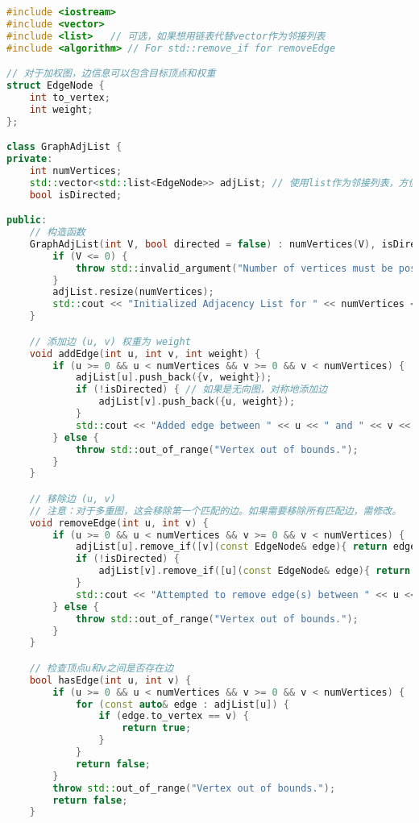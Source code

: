 \begin{lstlisting}[language=cpp]
#include <iostream>
#include <vector>
#include <list>   // 可选，如果想用链表代替vector作为邻接列表
#include <algorithm> // For std::remove_if for removeEdge

// 对于加权图，边信息可以包含目标顶点和权重
struct EdgeNode {
    int to_vertex;
    int weight;
};

class GraphAdjList {
private:
    int numVertices;
    std::vector<std::list<EdgeNode>> adjList; // 使用list作为邻接列表，方便删除边
    bool isDirected;

public:
    // 构造函数
    GraphAdjList(int V, bool directed = false) : numVertices(V), isDirected(directed) {
        if (V <= 0) {
            throw std::invalid_argument("Number of vertices must be positive.");
        }
        adjList.resize(numVertices);
        std::cout << "Initialized Adjacency List for " << numVertices << " vertices." << std::endl;
    }

    // 添加边 (u, v) 权重为 weight
    void addEdge(int u, int v, int weight) {
        if (u >= 0 && u < numVertices && v >= 0 && v < numVertices) {
            adjList[u].push_back({v, weight});
            if (!isDirected) { // 如果是无向图，对称地添加边
                adjList[v].push_back({u, weight});
            }
            std::cout << "Added edge between " << u << " and " << v << " with weight " << weight << "." << std::endl;
        } else {
            throw std::out_of_range("Vertex out of bounds.");
        }
    }

    // 移除边 (u, v)
    // 注意：对于多重图，这会移除第一个匹配的边。如果需要移除所有匹配边，需修改。
    void removeEdge(int u, int v) {
        if (u >= 0 && u < numVertices && v >= 0 && v < numVertices) {
            adjList[u].remove_if([v](const EdgeNode& edge){ return edge.to_vertex == v; });
            if (!isDirected) {
                adjList[v].remove_if([u](const EdgeNode& edge){ return edge.to_vertex == u; });
            }
            std::cout << "Attempted to remove edge(s) between " << u << " and " << v << "." << std::endl;
        } else {
            throw std::out_of_range("Vertex out of bounds.");
        }
    }

    // 检查顶点u和v之间是否存在边
    bool hasEdge(int u, int v) {
        if (u >= 0 && u < numVertices && v >= 0 && v < numVertices) {
            for (const auto& edge : adjList[u]) {
                if (edge.to_vertex == v) {
                    return true;
                }
            }
            return false;
        }
        throw std::out_of_range("Vertex out of bounds.");
        return false;
    }
    

\end{lstlisting}
